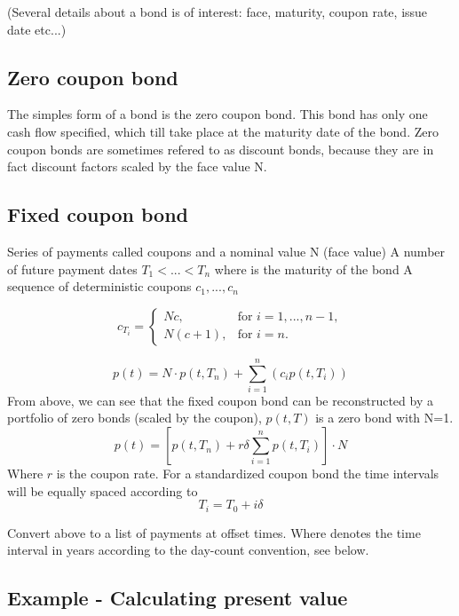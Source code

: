 \documentclass[11pt,a4paper]{article}
\numberwithin{equation}{section}
\begin{document}
	(Several details about a bond is of interest: face, maturity, coupon rate, issue date etc...)

	\label{sec:fi}

	\subsection{Zero coupon bond}
	The simples form of a bond is the zero coupon bond. This bond has only one cash flow specified, which till take place at the maturity date of the bond. Zero coupon bonds are sometimes refered to as discount bonds, because they are in fact discount factors scaled by the face value N.


	\subsection{Fixed coupon bond}
	Series of payments called coupons and a nominal value N (face value)
	A number of future payment dates $T_1 < ... < T_n$ where is the maturity of the bond
	A sequence of deterministic coupons $c_1, ..., c_n$

	\[ c_{T_i} = \left\{
	\begin{array}{ll}
	  Nc, & \text{for } i=1,...,n-1,  \\
	  N(c+1), &\text{for } i=n.
	\end{array} \right.\]

	\[
	p(t) = N \cdot p(t,T_n)+\sum_{i=1}^{n} (c_ip(t,T_i))
	\]
	From above, we can see that the fixed coupon bond can be reconstructed by a portfolio of zero
	bonds (scaled by the coupon), $p(t,T)$ is a zero bond with N=1.
	\[
	p(t)=\left[p(t,T_n)+r\delta\sum_{i=1}^{n} p(t,T_i)\right]\cdot N
	\]
	Where $r$ is the coupon rate. For a standardized coupon bond the time intervals will be equally
	spaced according to
	\[
	T_i=T_0+i\delta
	\]

	Convert above to a list of payments at offset times. Where denotes the time interval in years
	according to the day-count convention, see below.

	\subsection{Example - Calculating present value}

\end{document}
